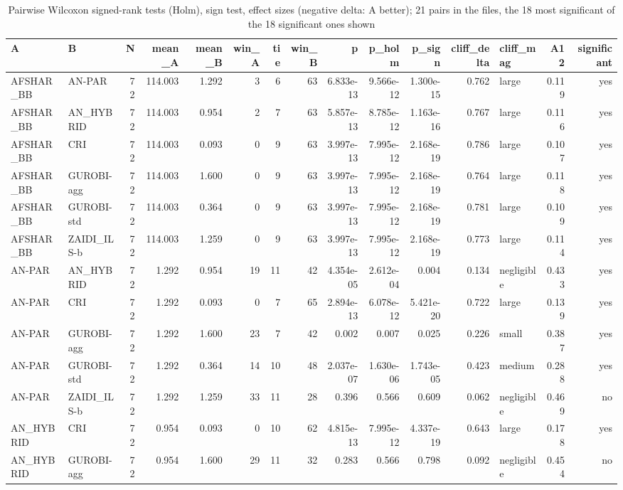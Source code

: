 \begin{table}[htbp]
\centering
\small
\caption{Pairwise Wilcoxon signed-rank tests (Holm), sign test, effect sizes (negative delta: A better); 21 pairs in the files, the 18 most significant of the 18 significant ones shown}
\label{tab:E10b_state_of_the_art_60s_b60_pairwise}
\begin{tabular}{llrrrrrrrrrrlrr}
\toprule
A & B & N & mean\_A & mean\_B & win\_A & tie & win\_B & p & p\_holm & p\_sign & cliff\_delta & cliff\_mag & A12 & significant \\
\midrule
AFSHAR\_BB & AN-PAR & 72 & 114.003 & 1.292 & 3 & 6 & 63 & 6.833e-13 & 9.566e-12 & 1.300e-15 & 0.762 & large & 0.119 & yes \\
AFSHAR\_BB & AN\_HYBRID & 72 & 114.003 & 0.954 & 2 & 7 & 63 & 5.857e-13 & 8.785e-12 & 1.163e-16 & 0.767 & large & 0.116 & yes \\
AFSHAR\_BB & CRI & 72 & 114.003 & 0.093 & 0 & 9 & 63 & 3.997e-13 & 7.995e-12 & 2.168e-19 & 0.786 & large & 0.107 & yes \\
AFSHAR\_BB & GUROBI-agg & 72 & 114.003 & 1.600 & 0 & 9 & 63 & 3.997e-13 & 7.995e-12 & 2.168e-19 & 0.764 & large & 0.118 & yes \\
AFSHAR\_BB & GUROBI-std & 72 & 114.003 & 0.364 & 0 & 9 & 63 & 3.997e-13 & 7.995e-12 & 2.168e-19 & 0.781 & large & 0.109 & yes \\
AFSHAR\_BB & ZAIDI\_ILS-b & 72 & 114.003 & 1.259 & 0 & 9 & 63 & 3.997e-13 & 7.995e-12 & 2.168e-19 & 0.773 & large & 0.114 & yes \\
AN-PAR & AN\_HYBRID & 72 & 1.292 & 0.954 & 19 & 11 & 42 & 4.354e-05 & 2.612e-04 & 0.004 & 0.134 & negligible & 0.433 & yes \\
AN-PAR & CRI & 72 & 1.292 & 0.093 & 0 & 7 & 65 & 2.894e-13 & 6.078e-12 & 5.421e-20 & 0.722 & large & 0.139 & yes \\
AN-PAR & GUROBI-agg & 72 & 1.292 & 1.600 & 23 & 7 & 42 & 0.002 & 0.007 & 0.025 & 0.226 & small & 0.387 & yes \\
AN-PAR & GUROBI-std & 72 & 1.292 & 0.364 & 14 & 10 & 48 & 2.037e-07 & 1.630e-06 & 1.743e-05 & 0.423 & medium & 0.288 & yes \\
AN-PAR & ZAIDI\_ILS-b & 72 & 1.292 & 1.259 & 33 & 11 & 28 & 0.396 & 0.566 & 0.609 & 0.062 & negligible & 0.469 & no \\
AN\_HYBRID & CRI & 72 & 0.954 & 0.093 & 0 & 10 & 62 & 4.815e-13 & 7.995e-12 & 4.337e-19 & 0.643 & large & 0.178 & yes \\
AN\_HYBRID & GUROBI-agg & 72 & 0.954 & 1.600 & 29 & 11 & 32 & 0.283 & 0.566 & 0.798 & 0.092 & negligible & 0.454 & no \\

\end{tabular}
\end{table}

